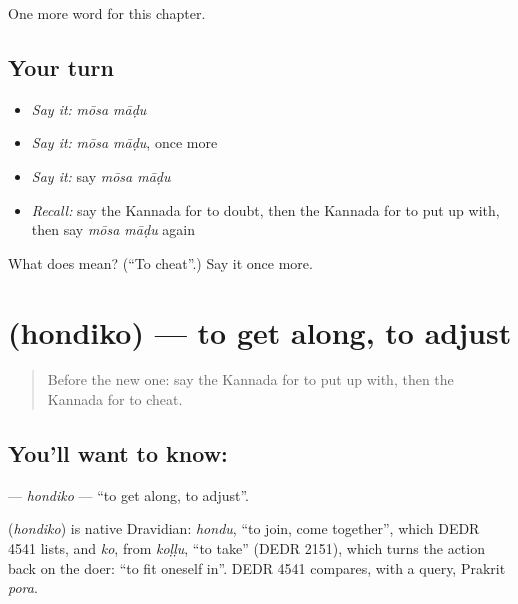 \begin{grammarlens}[title={What you've built}]
One more word for this chapter.
\end{grammarlens}

\subsection*{Your turn}
\begin{itemize}
\raggedright
  \item \emph{Say it:} \emph{mōsa māḍu}
  \item \emph{Say it:} \emph{mōsa māḍu}, once more
  \item \emph{Say it:} say \emph{mōsa māḍu}
  \item \emph{Recall:} say the Kannada for to doubt, then the Kannada for to put up with, then say \emph{mōsa māḍu} again
\end{itemize}

\begin{tcolorbox}[breakable,colback=teal!4,colframe=teal!35!black,title={Before you move on}]
What does   mean? (\textquotedblleft{}To cheat\textquotedblright{}.) Say it once more.
\end{tcolorbox}
\section[\texorpdfstring{\kn{ಹೊಂದಿಕೊ} (hondiko)}{ಹೊಂದಿಕೊ (hondiko)}]{ (hondiko) — to get along, to adjust}

\label{lesson:KA-C163-hondiko}



\begin{quote}
Before the new one: say the Kannada for to put up with, then the Kannada for to cheat.
\end{quote}

\subsection*{You'll want to know: }
\textbf{} — \emph{hondiko} — \textquotedblleft{}to get along, to adjust\textquotedblright{}.

\begin{cousinweb}
\textbf{} (\emph{hondiko}) is native Dravidian: \emph{hondu}, \textquotedblleft{}to join, come together\textquotedblright{}, which DEDR 4541 lists, and \emph{ko}, from \emph{koḷḷu}, \textquotedblleft{}to take\textquotedblright{} (DEDR 2151), which turns the action back on the doer: \textquotedblleft{}to fit oneself in\textquotedblright{}. DEDR 4541 compares, with a query, Prakrit \emph{pora}.
\end{cousinweb}

